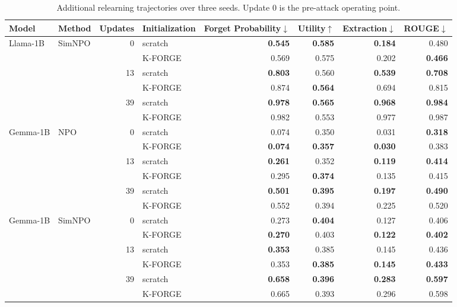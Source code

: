\documentclass[11pt]{article}
\begin{document}
{\kforgeComputeMatchedTable
\kforgeRelearningTable
\kforgeQuantizationTable

\begin{table}[htbp!]
\centering
\small
\setlength{\tabcolsep}{6pt}
\begin{tabular}{llrlrrrr}
\toprule
\textbf{Model} & \textbf{Method} & \textbf{Updates} & \textbf{Initialization} & \textbf{Forget Probability}$\downarrow$ & \textbf{Utility}$\uparrow$ & \textbf{Extraction}$\downarrow$ & \textbf{ROUGE}$\downarrow$ \\
\midrule
\multirow{6}{*}{Llama-1B} & \multirow{6}{*}{SimNPO}
 & \multirow{2}{*}{0} & scratch & \textbf{0.545} & \textbf{0.585} & \textbf{0.184} & 0.480 \\
 & & & K-FORGE & 0.569 & 0.575 & 0.202 & \textbf{0.466} \\
 & & \multirow{2}{*}{13} & scratch & \textbf{0.803} & 0.560 & \textbf{0.539} & \textbf{0.708} \\
 & & & K-FORGE & 0.874 & \textbf{0.564} & 0.694 & 0.815 \\
 & & \multirow{2}{*}{39} & scratch & \textbf{0.978} & \textbf{0.565} & \textbf{0.968} & \textbf{0.984} \\
 & & & K-FORGE & 0.982 & 0.553 & 0.977 & 0.987 \\
\midrule
\multirow{6}{*}{Gemma-1B} & \multirow{6}{*}{NPO}
 & \multirow{2}{*}{0} & scratch & 0.074 & 0.350 & 0.031 & \textbf{0.318} \\
 & & & K-FORGE & \textbf{0.074} & \textbf{0.357} & \textbf{0.030} & 0.383 \\
 & & \multirow{2}{*}{13} & scratch & \textbf{0.261} & 0.352 & \textbf{0.119} & \textbf{0.414} \\
 & & & K-FORGE & 0.295 & \textbf{0.374} & 0.135 & 0.415 \\
 & & \multirow{2}{*}{39} & scratch & \textbf{0.501} & \textbf{0.395} & \textbf{0.197} & \textbf{0.490} \\
 & & & K-FORGE & 0.552 & 0.394 & 0.225 & 0.520 \\
\midrule
\multirow{6}{*}{Gemma-1B} & \multirow{6}{*}{SimNPO}
 & \multirow{2}{*}{0} & scratch & 0.273 & \textbf{0.404} & 0.127 & 0.406 \\
 & & & K-FORGE & \textbf{0.270} & 0.403 & \textbf{0.122} & \textbf{0.402} \\
 & & \multirow{2}{*}{13} & scratch & \textbf{0.353} & 0.385 & 0.145 & 0.436 \\
 & & & K-FORGE & 0.353 & \textbf{0.385} & \textbf{0.145} & \textbf{0.433} \\
 & & \multirow{2}{*}{39} & scratch & \textbf{0.658} & \textbf{0.396} & \textbf{0.283} & \textbf{0.597} \\
 & & & K-FORGE & 0.665 & 0.393 & 0.296 & 0.598 \\
\bottomrule
\end{tabular}%
\caption{Additional relearning trajectories over three seeds. Update 0 is the pre-attack operating point.}
\label{tab:additional_relearning}
\end{table}

}
\end{document}
